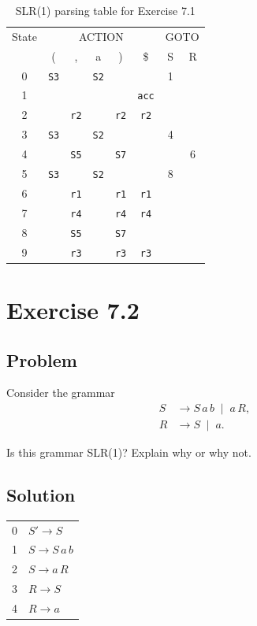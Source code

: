 \begin{table}[htbp]
\centering
\begin{tabular}{c|ccccc|cc}
State & \multicolumn{5}{c|}{ACTION} & \multicolumn{2}{c}{GOTO} \\
 & ( & , & a & ) & \$ & S & R \\
\hline
0 & \texttt{S3} &  & \texttt{S2} &  &  & 1 &  \\
1 &  &  &  &  & \texttt{acc} &  &  \\
2 &  & \texttt{r2} &  & \texttt{r2} & \texttt{r2} &  &  \\
3 & \texttt{S3} &  & \texttt{S2} &  &  & 4 &  \\
4 &  & \texttt{S5} &  & \texttt{S7} &  &  & 6 \\
5 & \texttt{S3} &  & \texttt{S2} &  &  & 8 &  \\
6 &  & \texttt{r1} &  & \texttt{r1} & \texttt{r1} &  &  \\
7 &  & \texttt{r4} &  & \texttt{r4} & \texttt{r4} &  &  \\
8 & & \texttt{S5} &  & \texttt{S7} &  &  &  \\
9 &  & \texttt{r3} &  & \texttt{r3} & \texttt{r3} &  &  \\
\end{tabular}
\caption{SLR(1) parsing table for Exercise 7.1 }
\end{table}


\section{Exercise 7.2}
\subsection{Problem}
Consider the grammar
\[
\begin{aligned}
S &\to S\,a\,b \;\mid\; a\,R, \\
R &\to S \;\mid\; a.
\end{aligned}
\]

Is this grammar SLR(1)? Explain why or why not.

\subsection{Solution}

\begin{center}
\begin{tabular}{r l}
0 & $S'\to S$ \\
1 & $S\to S\,a\,b$ \\
2 & $S\to a\,R$ \\
3 & $R\to S$ \\
4 & $R\to a$
\end{tabular}
\end{center}

